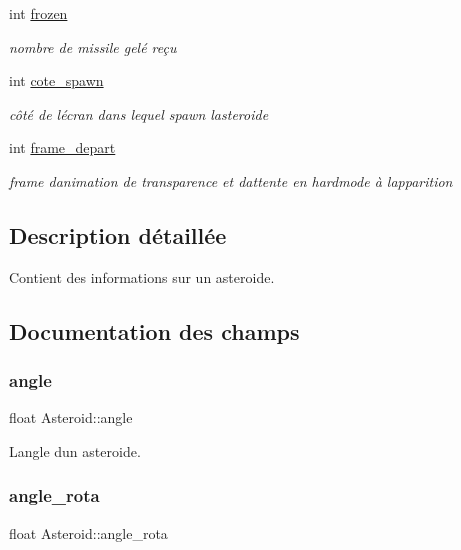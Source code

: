 \begin{DoxyCompactItemize}
int \hyperlink{struct_asteroid_a3f7bec61c78234d5e4685787927ac563}{frozen}
\begin{DoxyCompactList}\small\item\em nombre de missile gelé reçu \end{DoxyCompactList}\item 
int \hyperlink{struct_asteroid_ad22a8ef78c1ce52730fb286c525663db}{cote\+\_\+spawn}
\begin{DoxyCompactList}\small\item\em côté de l\textquotesingle{}écran dans lequel spawn l\textquotesingle{}asteroide \end{DoxyCompactList}\item 
int \hyperlink{struct_asteroid_a2162b2408ddf727e63ce810920ae2660}{frame\+\_\+depart}
\begin{DoxyCompactList}\small\item\em frame d\textquotesingle{}animation de transparence et d\textquotesingle{}attente en hardmode à l\textquotesingle{}apparition \end{DoxyCompactList}\end{DoxyCompactItemize}


\subsection{Description détaillée}
Contient des informations sur un asteroide. 

\subsection{Documentation des champs}
\mbox{\label{struct_asteroid_abdc5722d109d6c0a9e3a68cbf1ccaeb4}} 
\subsubsection{\texorpdfstring{angle}{angle}}
{\footnotesize\ttfamily float Asteroid\+::angle}



L\textquotesingle{}angle d\textquotesingle{}un asteroide. 

\mbox{\label{struct_asteroid_aa4566a498bb89428a50e66cb578e4f3a}} 
\subsubsection{\texorpdfstring{angle\+\_\+rota}{angle\_rota}}
{\footnotesize\ttfamily float Asteroid\+::angle\+\_\+rota}



